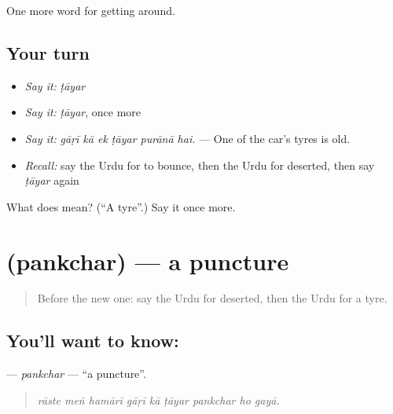 \begin{grammarlens}[title={What you've built}]
One more word for getting around.
\end{grammarlens}

\subsection*{Your turn}
\begin{itemize}
\raggedright
  \item \emph{Say it:} \emph{ṭāyar}
  \item \emph{Say it:} \emph{ṭāyar}, once more
  \item \emph{Say it:} \emph{gāṛī kā ek ṭāyar purānā hai.} — One of the car's tyres is old.
  \item \emph{Recall:} say the Urdu for to bounce, then the Urdu for deserted, then say \emph{ṭāyar} again
\end{itemize}

\begin{tcolorbox}[breakable,colback=teal!4,colframe=teal!35!black,title={Before you move on}]
What does  mean? (\textquotedblleft{}A tyre\textquotedblright{}.) Say it once more.
\end{tcolorbox}
\section[\texorpdfstring{\ur{پنکچر} (pankchar)}{پنکچر (pankchar)}]{ (pankchar) — a puncture}

\label{lesson:UR-C395-pankchar}



\begin{quote}
Before the new one: say the Urdu for deserted, then the Urdu for a tyre.
\end{quote}

\subsection*{You'll want to know: }
\textbf{} — \emph{pankchar} — \textquotedblleft{}a puncture\textquotedblright{}.

\begin{quote}
        
\end{quote}

\begin{quote}
\emph{rāste meṅ hamārī gāṛī kā ṭāyar pankchar ho gayā.}
\end{quote}

